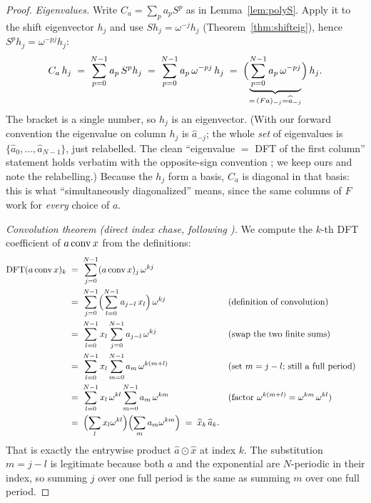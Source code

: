 \begin{proof}
\emph{Eigenvalues.} Write $C_a = \sum_p a_p S^p$ as in Lemma~\ref{lem:polyS}. Apply it
to the shift eigenvector $h_j$ and use $S h_j = \omega^{-j} h_j$
(Theorem~\ref{thm:shifteig}), hence $S^p h_j = \omega^{-pj} h_j$:
\[
  C_a\, h_j \;=\; \sum_{p=0}^{N-1} a_p\, S^p h_j
            \;=\; \sum_{p=0}^{N-1} a_p\, \omega^{-pj}\, h_j
            \;=\; \Bigl(\underbrace{\sum_{p=0}^{N-1} a_p\, \omega^{-pj}}_{=\,(Fa)_{-j}=\widehat a_{-j}}\Bigr)\, h_j .
\]
The bracket is a single number, so $h_j$ is an eigenvector. (With our forward
convention the eigenvalue on column $h_j$ is $\widehat a_{-j}$; the whole \emph{set} of
eigenvalues is $\{\widehat a_0, \dots, \widehat a_{N-1}\}$, just relabelled. The clean
``eigenvalue $=$ DFT of the first column'' statement holds verbatim with the
opposite-sign convention \citep{fourier_bamieh}; we keep ours and note the relabelling.)
Because the $h_j$ form a basis, $C_a$ is diagonal in that basis: this is what
``simultaneously diagonalized'' means, since the same columns of $F$ work for
\emph{every} choice of $a$.

\emph{Convolution theorem (direct index chase, following
\citep{fourier_rutgers,wiki_convolution}).} We compute the $k$-th DFT coefficient of
$a \operatorname{conv} x$ from the definitions:
\begin{align*}
  \mathrm{DFT}(a \operatorname{conv} x)_k
    \;&=\; \sum_{j=0}^{N-1} (a \operatorname{conv} x)_j\, \omega^{kj} \\
    \;&=\; \sum_{j=0}^{N-1} \Bigl(\sum_{l=0}^{N-1} a_{j-l}\, x_l\Bigr)\, \omega^{kj}
        &&\text{(definition of convolution)} \\
    \;&=\; \sum_{l=0}^{N-1} x_l \sum_{j=0}^{N-1} a_{j-l}\, \omega^{kj}
        &&\text{(swap the two finite sums)} \\
    \;&=\; \sum_{l=0}^{N-1} x_l \sum_{m=0}^{N-1} a_{m}\, \omega^{k(m+l)}
        &&\text{(set $m = j - l$; still a full period)} \\
    \;&=\; \sum_{l=0}^{N-1} x_l\, \omega^{kl} \sum_{m=0}^{N-1} a_{m}\, \omega^{km}
        &&\text{(factor $\omega^{k(m+l)} = \omega^{km}\,\omega^{kl}$)} \\
    \;&=\; \Bigl(\sum_{l} x_l \omega^{kl}\Bigr)\Bigl(\sum_{m} a_m \omega^{km}\Bigr)
        \;=\; \widehat{x}_k\,\widehat{a}_k .
\end{align*}
That is exactly the entrywise product $\widehat a \odot \widehat x$ at index $k$. The
substitution $m = j - l$ is legitimate because both $a$ and the exponential are
$N$-periodic in their index, so summing $j$ over one full period is the same as summing
$m$ over one full period.
\end{proof}

